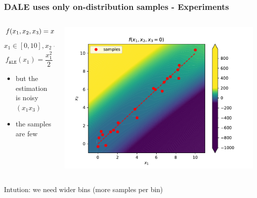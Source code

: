 \documentclass{beamer}
\begin{document}
\begin{frame}
  \frametitle{DALE uses only on-distribution samples - Experiments}
\begin{columns}
\begin{column}{0.5\textwidth}
  \[ f(x_1, x_2, x_3) = x_1x_2 + x_1x_3 \textcolor{red}{ \pm g(x)}\]
  \[ x_1 \in [0,10], x_2 \sim x_1 + \epsilon, x_3 \sim \mathcal{N}(0, \sigma^2) \]
  \[ f_{\mathtt{ALE}}(x_1) = \frac{x_1^2}{2} \]
  \begin{itemize}
  \item but the estimation is noisy \((x_1x_3)\)
  \item the samples are few
  \end{itemize}
\end{column}
\begin{column}{0.5\textwidth}  %
    \begin{center}
     \includegraphics[width=\textwidth]{./figures/f_plot.pdf}
     \end{center}
\end{column}
\end{columns}

\noindent\makebox[\linewidth]{\rule{\paperwidth}{0.4pt}}
Intution: we need wider bins (more samples per bin)
\end{frame}
\end{document}
